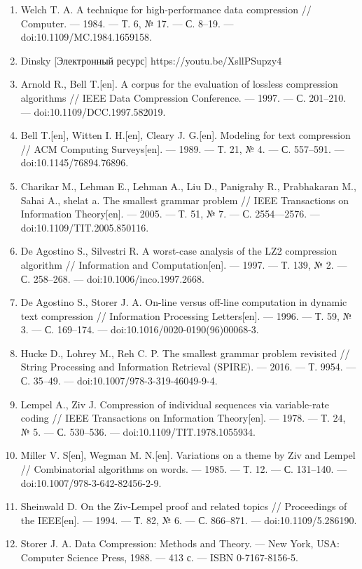 \documentclass{article}
\begin{document}
\begin{enumerate}
\item Welch T. A. A technique for high-performance data compression // Computer. — 1984. — Т. 6, № 17. — С. 8–19. — doi:10.1109/MC.1984.1659158.
\item Dinsky [Электронный ресурс] https://youtu.be/XsllPSupzy4
\item Arnold R., Bell T.[en]. A corpus for the evaluation of lossless compression algorithms // IEEE Data Compression Conference. — 1997. — С. 201–210. — doi:10.1109/DCC.1997.582019.
\item Bell T.[en], Witten I. H.[en], Cleary J. G.[en]. Modeling for text compression // ACM Computing Surveys[en]. — 1989. — Т. 21, № 4. — С. 557–591. — doi:10.1145/76894.76896.
\item Charikar M., Lehman E., Lehman A., Liu D., Panigrahy R., Prabhakaran M., Sahai A., shelat a. The smallest grammar problem // IEEE Transactions on Information Theory[en]. — 2005. — Т. 51, № 7. — С. 2554—2576. — doi:10.1109/TIT.2005.850116.
\item De Agostino S., Silvestri R. A worst-case analysis of the LZ2 compression algorithm // Information and Computation[en]. — 1997. — Т. 139, № 2. — С. 258–268. — doi:10.1006/inco.1997.2668.
\item De Agostino S., Storer J. A. On-line versus off-line computation in dynamic text compression // Information Processing Letters[en]. — 1996. — Т. 59, № 3. — С. 169–174. — doi:10.1016/0020-0190(96)00068-3.
\item Hucke D., Lohrey M., Reh C. P. The smallest grammar problem revisited // String Processing and Information Retrieval (SPIRE). — 2016. — Т. 9954. — С. 35–49. — doi:10.1007/978-3-319-46049-9-4.
\item Lempel A., Ziv J. Compression of individual sequences via variable-rate coding // IEEE Transactions on Information Theory[en]. — 1978. — Т. 24, № 5. — С. 530–536. — doi:10.1109/TIT.1978.1055934.
\item Miller V. S[en], Wegman M. N.[en]. Variations on a theme by Ziv and Lempel // Combinatorial algorithms on words. — 1985. — Т. 12. — С. 131–140. — doi:10.1007/978-3-642-82456-2-9.
\item Sheinwald D. On the Ziv-Lempel proof and related topics // Proceedings of the IEEE[en]. — 1994. — Т. 82, № 6. — С. 866–871. — doi:10.1109/5.286190.
\item Storer J. A. Data Compression: Methods and Theory. — New York, USA: Computer Science Press, 1988. — 413 с. — ISBN 0-7167-8156-5.

\end{enumerate}
\end{document}
